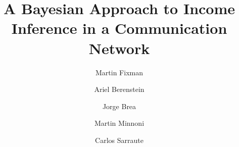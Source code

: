 



\title{A Bayesian Approach to Income Inference in a Communication Network}

\author[1,2]{Martin Fixman}
\author[1]{Ariel Berenstein}
\author[1]{Jorge Brea}
\author[1]{Martin Minnoni}
\author[1]{Carlos Sarraute}


\maketitle

\begin{abstract}
	
\end{abstract}











{}


